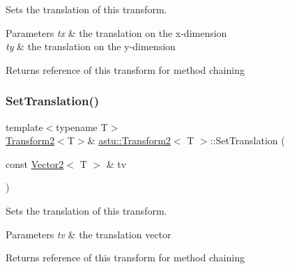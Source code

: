 Sets the translation of this transform.


\begin{DoxyParams}{Parameters}
{\em tx} & the translation on the x-\/dimension \\
\hline
{\em ty} & the translation on the y-\/dimension \\
\hline
\end{DoxyParams}
\begin{DoxyReturn}{Returns}
reference of this transform for method chaining 
\end{DoxyReturn}
\mbox{\label{classastu_1_1Transform2_a86b12fb6fb1e2a865b8b9f4e71feb450}} 
\subsubsection{\texorpdfstring{Set\+Translation()}{SetTranslation()}\hspace{0.1cm}{\footnotesize\ttfamily [2/2]}}
{\footnotesize\ttfamily template$<$typename T$>$ \\
\hyperlink{classastu_1_1Transform2}{Transform2}$<$T$>$\& \hyperlink{classastu_1_1Transform2}{astu\+::\+Transform2}$<$ T $>$\+::Set\+Translation (\begin{DoxyParamCaption}\item[{const \hyperlink{classastu_1_1Vector2}{Vector2}$<$ T $>$ \&}]{tv }\end{DoxyParamCaption})\hspace{0.3cm}{\ttfamily [inline]}}

Sets the translation of this transform.


\begin{DoxyParams}{Parameters}
{\em tv} & the translation vector \\
\hline
\end{DoxyParams}
\begin{DoxyReturn}{Returns}
reference of this transform for method chaining 
\end{DoxyReturn}
\mbox{\label{classastu_1_1Transform2_a3276e4c024e2ca1fcb9a776ebee8152c}} 
